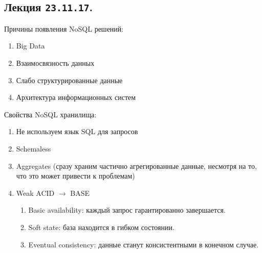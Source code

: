 \subsection{%
  Лекция \texttt{23.11.17}.%
}

Причины появления NoSQL решений:

\begin{enumerate}
\item
  Big Data

\item
  Взаимосвязность данных

\item
  Слабо структурированные данные

\item
  Архитектура информационных систем
\end{enumerate}

Свойства NoSQL хранилища:

\begin{enumerate}
\item
  Не используем язык SQL для запросов

\item
  Schemaless

\item
  Aggregates (сразу храним частично агрегированные данные, несмотря на то, что
  это может привести к проблемам)

\item
  Weak ACID \(\to\) BASE

  \begin{enumerate}
  \item
    Basic availability: каждый запрос гарантированно завершается.
  
  \item
    Soft state: база находится в гибком состоянии.

  \item
    Eventual consistency: данные станут консистентными в конечном случае.
  \end{enumerate}
\end{enumerate}

